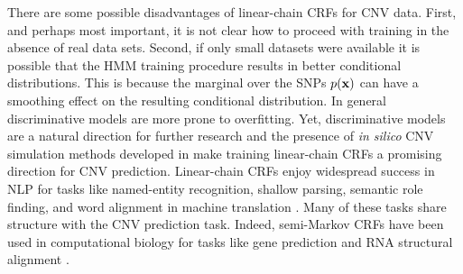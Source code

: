 There are some possible disadvantages of linear-chain CRFs for CNV data. First, and perhaps most important, it is not clear how to proceed with training in the absence of real data sets. Second, if only small datasets were available it is possible that the HMM training procedure results in better conditional distributions. This is because the marginal over the SNPs $p(\mathbf{x})$ can have a smoothing effect on the resulting conditional distribution. In general discriminative models are more prone to overfitting. Yet, discriminative models are a natural direction for further research and the presence of \textit{in silico} CNV simulation methods developed in \citep{rampasek2014fcnv} make training linear-chain CRFs a promising direction for CNV prediction. Linear-chain CRFs enjoy widespread success in NLP for tasks like named-entity recognition, shallow parsing, semantic role finding, and word alignment in machine translation \citep{sutton2012}. Many of these tasks share structure with the CNV prediction task.  Indeed, semi-Markov CRFs have been used in computational biology for tasks like gene prediction \citep{bernal2007} and RNA structural alignment \citep{Sato01012005}.


%
